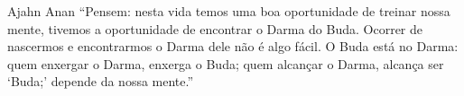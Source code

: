 
\begin{quotepage}{0.6\linewidth}{Ajahn Anan}
“Pensem: nesta vida temos uma boa oportunidade de treinar nossa mente,
tivemos a oportunidade de encontrar o Darma do Buda. Ocorrer de
nascermos e encontrarmos o Darma dele não é algo fácil. O Buda está no
Darma: quem enxergar o Darma, enxerga o Buda; quem alcançar o Darma,
alcança ser ‘Buda;’ depende da nossa mente.”
\end{quotepage}

